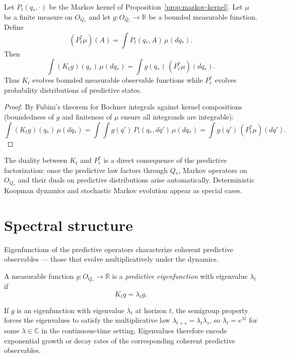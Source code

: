 \begin{proposition}\label{prop:duality}
Let $P_t(q_*,\cdot)$ be the Markov kernel of
Proposition~\ref{prop:markov-kernel}.  Let $\mu$ be a finite measure
on $O_{Q_*}$ and let $g:O_{Q_*}\to\mathbb R$ be a bounded measurable
function.  Define
\[
(P_t^*\mu)(A) = \int P_t(q_*,A)\,\mu(dq_*).
\]
Then
\[
\int (K_t g)(q_*)\,\mu(dq_*)
=
\int g(q_*)\,(P_t^*\mu)(dq_*).
\]
Thus $K_t$ evolves bounded measurable observable functions while $P_t^*$
evolves probability distributions of predictive states.
\end{proposition}

\begin{proof}
By Fubini's theorem for Bochner integrals against kernel compositions
(boundedness of $g$ and finiteness of $\mu$ ensure all integrands are
integrable):
\[
\int (K_t g)(q_*)\,\mu(dq_*)
= \int\!\int g(q')\,P_t(q_*,dq')\,\mu(dq_*)
= \int g(q')\,(P_t^*\mu)(dq').
\]
\end{proof}

\begin{remark}
The duality between $K_t$ and $P_t^*$ is a direct consequence of the
predictive factorization: once the predictive law factors through
$Q_*$, Markov operators on $O_{Q_*}$ and their duals on predictive
distributions arise automatically.  Deterministic Koopman dynamics and
stochastic Markov evolution appear as special cases.
\end{remark}

\section{Spectral structure}\label{sec:spectral}

Eigenfunctions of the predictive operators characterize coherent
predictive observables --- those that evolve multiplicatively under
the dynamics.

\begin{definition}\label{def:eigenfunction}
A measurable function $g:O_{Q_*}\to\mathbb R$ is a
\emph{predictive eigenfunction} with eigenvalue $\lambda_t$ if
\[
K_t g = \lambda_t g.
\]
\end{definition}

If $g$ is an eigenfunction with eigenvalue $\lambda_t$ at horizon $t$,
the semigroup property forces the eigenvalues to satisfy the
multiplicative law $\lambda_{t+s}=\lambda_t\lambda_s$, so
$\lambda_t = e^{\lambda t}$ for some $\lambda\in\mathbb C$ in the
continuous-time setting.  Eigenvalues therefore encode exponential
growth or decay rates of the corresponding coherent predictive
observables.

